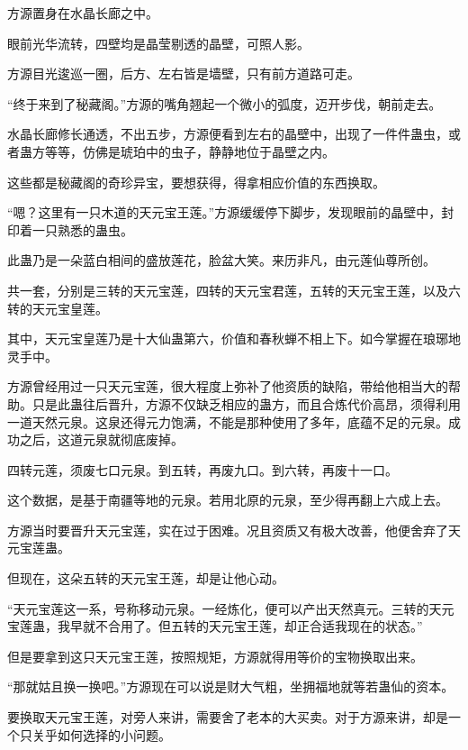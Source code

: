 
\begin{this_body}

方源置身在水晶长廊之中。

眼前光华流转，四壁均是晶莹剔透的晶壁，可照人影。

方源目光逡巡一圈，后方、左右皆是墙壁，只有前方道路可走。

“终于来到了秘藏阁。”方源的嘴角翘起一个微小的弧度，迈开步伐，朝前走去。

水晶长廊修长通透，不出五步，方源便看到左右的晶壁中，出现了一件件蛊虫，或者蛊方等等，仿佛是琥珀中的虫子，静静地位于晶壁之内。

这些都是秘藏阁的奇珍异宝，要想获得，得拿相应价值的东西换取。

“嗯？这里有一只木道的天元宝王莲。”方源缓缓停下脚步，发现眼前的晶壁中，封印着一只熟悉的蛊虫。

此蛊乃是一朵蓝白相间的盛放莲花，脸盆大笑。来历非凡，由元莲仙尊所创。

共一套，分别是三转的天元宝莲，四转的天元宝君莲，五转的天元宝王莲，以及六转的天元宝皇莲。

其中，天元宝皇莲乃是十大仙蛊第六，价值和春秋蝉不相上下。如今掌握在琅琊地灵手中。

方源曾经用过一只天元宝莲，很大程度上弥补了他资质的缺陷，带给他相当大的帮助。只是此蛊往后晋升，方源不仅缺乏相应的蛊方，而且合炼代价高昂，须得利用一道天然元泉。这泉还得元力饱满，不能是那种使用了多年，底蕴不足的元泉。成功之后，这道元泉就彻底废掉。

四转元莲，须废七口元泉。到五转，再废九口。到六转，再废十一口。

这个数据，是基于南疆等地的元泉。若用北原的元泉，至少得再翻上六成上去。

方源当时要晋升天元宝莲，实在过于困难。况且资质又有极大改善，他便舍弃了天元宝莲蛊。

但现在，这朵五转的天元宝王莲，却是让他心动。

“天元宝莲这一系，号称移动元泉。一经炼化，便可以产出天然真元。三转的天元宝莲蛊，我早就不合用了。但五转的天元宝王莲，却正合适我现在的状态。”

但是要拿到这只天元宝王莲，按照规矩，方源就得用等价的宝物换取出来。

“那就姑且换一换吧。”方源现在可以说是财大气粗，坐拥福地就等若蛊仙的资本。

要换取天元宝王莲，对旁人来讲，需要舍了老本的大买卖。对于方源来讲，却是一个只关乎如何选择的小问题。


\end{this_body}
